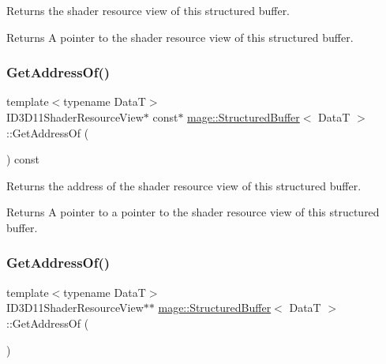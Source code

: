 Returns the shader resource view of this structured buffer.

\begin{DoxyReturn}{Returns}
A pointer to the shader resource view of this structured buffer. 
\end{DoxyReturn}
\hypertarget{structmage_1_1_structured_buffer_a116faa593af2b0872cb266eabe6b58a8}{}\label{structmage_1_1_structured_buffer_a116faa593af2b0872cb266eabe6b58a8} 
\subsubsection{\texorpdfstring{Get\+Address\+Of()}{GetAddressOf()}\hspace{0.1cm}{\footnotesize\ttfamily [1/2]}}
{\footnotesize\ttfamily template$<$typename DataT$>$ \\
I\+D3\+D11\+Shader\+Resource\+View$\ast$ const$\ast$ \hyperlink{structmage_1_1_structured_buffer}{mage\+::\+Structured\+Buffer}$<$ DataT $>$\+::Get\+Address\+Of (\begin{DoxyParamCaption}{ }\end{DoxyParamCaption}) const\hspace{0.3cm}{\ttfamily [noexcept]}}

Returns the address of the shader resource view of this structured buffer.

\begin{DoxyReturn}{Returns}
A pointer to a pointer to the shader resource view of this structured buffer. 
\end{DoxyReturn}
\hypertarget{structmage_1_1_structured_buffer_a1e05bab8441b847c5b7cd11e2f5003e7}{}\label{structmage_1_1_structured_buffer_a1e05bab8441b847c5b7cd11e2f5003e7} 
\subsubsection{\texorpdfstring{Get\+Address\+Of()}{GetAddressOf()}\hspace{0.1cm}{\footnotesize\ttfamily [2/2]}}
{\footnotesize\ttfamily template$<$typename DataT$>$ \\
I\+D3\+D11\+Shader\+Resource\+View$\ast$$\ast$ \hyperlink{structmage_1_1_structured_buffer}{mage\+::\+Structured\+Buffer}$<$ DataT $>$\+::Get\+Address\+Of (\begin{DoxyParamCaption}{ }\end{DoxyParamCaption})\hspace{0.3cm}{\ttfamily [noexcept]}}

